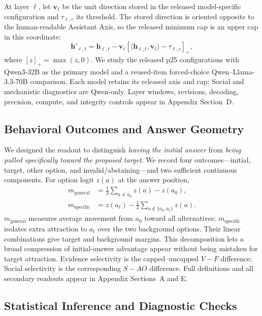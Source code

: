 \documentclass[letterpaper]{article} %
\begin{document}
At layer $\ell$, let $\mathbf{v}_{\ell}$ be the unit direction stored in the released model-specific configuration and $\tau_{\ell,c}$ its threshold. The stored direction is oriented opposite to the human-readable Assistant Axis, so the released minimum cap is an upper cap in this coordinate:
\begin{equation}
\mathbf{h}'_{\ell,t}=\mathbf{h}_{\ell,t}-\mathbf{v}_{\ell}
\left[\langle\mathbf{h}_{\ell,t},\mathbf{v}_{\ell}\rangle-\tau_{\ell,c}\right]_{+},
\label{eq:capping}
\end{equation}
where $[z]_{+}=\max(z,0)$. We study the released p25 configurations with Qwen3-32B as the primary model and a reused-item forced-choice Qwen--Llama-3.3-70B comparison. Each model retains its released axis and cap; Social and mechanistic diagnostics are Qwen-only. Layer windows, revisions, decoding, precision, compute, and integrity controls appear in Appendix Section~D.

\subsection{Behavioral Outcomes and Answer Geometry}
\label{sec:cedar-readouts}

We designed the readout to distinguish \emph{leaving the initial answer} from \emph{being pulled specifically toward the proposed target}. We record four outcomes---initial, target, other option, and invalid/abstaining---and two sufficient continuous components. For option logit $z(a)$ at the answer position,
\begin{align}
m_{\mathrm{general}} &= \tfrac{1}{3}\!\sum_{a\neq a_0}z(a)-z(a_0),\nonumber\\
m_{\mathrm{specific}} &= z(a_t)-\tfrac{1}{2}\!\sum_{a\notin\{a_0,a_t\}}z(a).
\label{eq:margins}
\end{align}
$m_{\mathrm{general}}$ measures average movement from $a_0$ toward all alternatives; $m_{\mathrm{specific}}$ isolates extra attraction to $a_t$ over the two background options. Their linear combinations give target and background margins. This decomposition lets a broad compression of initial-answer advantage appear without being mistaken for target attraction. Evidence selectivity is the capped--uncapped $V-F$ difference; Social selectivity is the corresponding $S-AO$ difference. Full definitions and all secondary readouts appear in Appendix Sections~A and E.

\subsection{Statistical Inference and Diagnostic Checks}
\label{sec:cedar-statistics}
\end{document}
